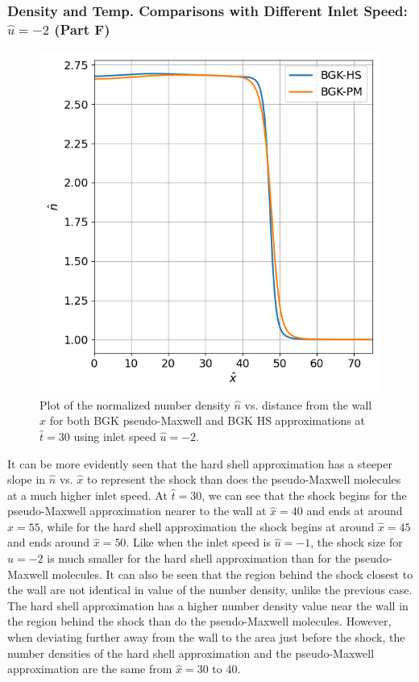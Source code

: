 \documentclass[a4paper]{article}
\begin{document}
\subsubsection{Density and Temp. Comparisons with Different Inlet Speed: $\hat{u} = -2$ (Part F)}
\begin{figure}[hbt!]
    \centering
    \includegraphics[width=14cm]{plots/problem_f_n.png}
    \caption{\centering Plot of the normalized number density $\hat{n}$ vs. distance from the wall $\hat{x}$ for both BGK pseudo-Maxwell and BGK HS approximations at $\hat{t} = 30$ using inlet speed $\hat{u} = -2$.}
    \label{problem_f_n}
\end{figure}
It can be more evidently seen that the hard shell approximation has a steeper slope in $\hat{n}$ vs. $\hat{x}$ to represent the shock than does the pseudo-Maxwell molecules at a much higher inlet speed. At $\hat{t} = 30$, we can see that the shock begins for the pseudo-Maxwell approximation nearer to the wall at $\hat{x} = 40$ and ends at around $\hat{x} = 55$, while for the hard shell approximation the shock begins at around $\hat{x} = 45$ and ends around $\hat{x} = 50$. Like when the inlet speed is $\hat{u} = -1$, the shock size for  $\hat{u} = -2$ is much smaller for the hard shell approximation than for the pseudo-Maxwell molecules. It can also be seen that the region behind the shock closest to the wall are not identical in value of the number density, unlike the previous case. The hard shell approximation has a higher number density value near the wall in the region behind the shock than do the pseudo-Maxwell molecules. However, when deviating further away from the wall to the area just before the shock, the number densities of the hard shell approximation and the pseudo-Maxwell approximation are the same from $\hat{x} = 30$ to $40$.  
\end{document}
